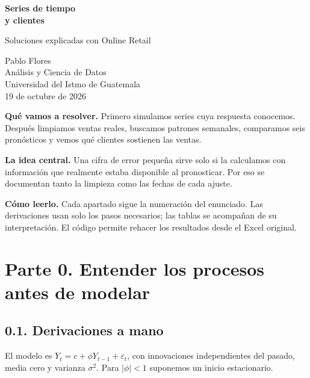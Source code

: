 \documentclass[11pt,letterpaper]{article}
\begin{document}
\begin{titlepage}
\vspace*{1.8cm}
{\color{azul}\Huge\bfseries Series de tiempo\\[.2cm] y clientes}\par
\vspace{.6cm}
{\Large Soluciones explicadas con Online Retail}\par
\vspace{1cm}
{\large Pablo Flores\\Análisis y Ciencia de Datos\\Universidad del Istmo de Guatemala\\19 de octubre de 2026}\par
\vspace{1cm}
\textbf{Qué vamos a resolver.} Primero simulamos series cuya respuesta conocemos. Después limpiamos ventas reales, buscamos patrones semanales, comparamos seis pronósticos y vemos qué clientes sostienen las ventas.

\textbf{La idea central.} Una cifra de error pequeña sirve solo si la calculamos con información que realmente estaba disponible al pronosticar. Por eso se documentan tanto la limpieza como las fechas de cada ajuste.

\textbf{Cómo leerlo.} Cada apartado sigue la numeración del enunciado. Las derivaciones usan solo los pasos necesarios; las tablas se acompañan de su interpretación. El código permite rehacer los resultados desde el Excel original.

\end{titlepage}

\section{Parte 0. Entender los procesos antes de modelar}
\subsection{0.1. Derivaciones a mano}
El modelo es $Y_t=c+\phi Y_{t-1}+\varepsilon_t$, con innovaciones independientes del pasado, media cero y varianza $\sigma^2$. Para $|\phi|<1$ suponemos un inicio estacionario.
\end{document}
